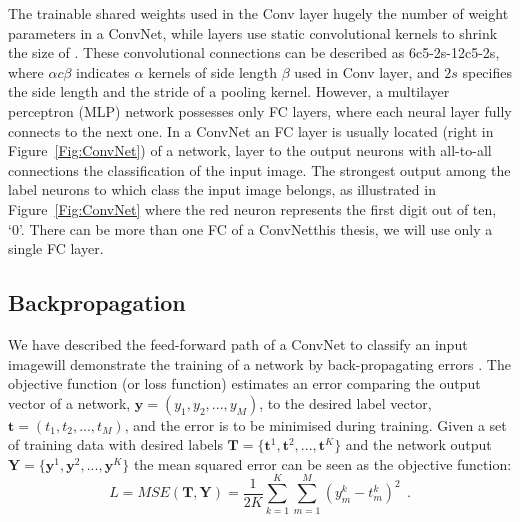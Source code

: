 The trainable shared weights used in the Conv layer hugely \DIFdelbegin {}\DIFdelend \DIFaddbegin {}\DIFaddend the number of weight parameters in a ConvNet, while \DIFdelbegin {}\DIFdelend \DIFaddbegin {}\DIFaddend layers use static convolutional kernels to shrink the size of \DIFdelbegin {}\DIFdelend \DIFaddbegin {}\DIFaddend .
These convolutional connections can be described as 6c5-2s-12c5-2s, where $\alpha c \beta$ indicates $\alpha$ kernels of side length $\beta$ used in \DIFaddbegin {}\DIFaddend Conv layer, and $2s$ specifies the side length and the stride of a pooling kernel.
However, a multilayer perceptron (MLP) network possesses only FC layers, where each neural layer fully connects to the next one.
In a ConvNet an FC layer is usually located \DIFdelbegin {}\DIFdelend \DIFaddbegin {}\DIFaddend (right in Figure~\ref{Fig:ConvNet}) of a network, \DIFdelbegin {}\DIFdelend \DIFaddbegin {}\DIFaddend layer to the output neurons with all-to-all connections \DIFdelbegin {}\DIFdelend \DIFaddbegin {}\DIFaddend the classification of the input image.
The strongest output among the label neurons \DIFdelbegin {}\DIFdelend \DIFaddbegin {}\DIFaddend to which class the input image belongs, as illustrated in Figure~\ref{Fig:ConvNet} where the red neuron represents the first digit out of ten, `0'.
There can be more than one FC \DIFdelbegin {}\DIFdelend \DIFaddbegin {}\DIFaddend of a ConvNet\DIFdelbegin {}\DIFdelend \DIFaddbegin {}\DIFaddend this thesis, we will use only a single FC layer.



\subsection{Backpropagation}
We have described the feed-forward path of a ConvNet to classify an input image\DIFdelbegin {}\DIFdelend \DIFaddbegin {}\DIFaddend will demonstrate the training of a network by back-propagating errors \DIFdelbegin {}\DIFdelend \DIFaddbegin {}\DIFaddend .
The objective function (or loss function) estimates an error \DIFaddbegin {}\DIFaddend comparing the output vector of a network, $\mathbf{y}=(y_1,y_2,...,y_M)$, to the desired label vector, $\mathbf{t}=(t_1,t_2,...,t_M)$, and the error is to be minimised during training.
Given a set of training data with desired labels $\mathbf{T}=\{\mathbf{t}^1, \mathbf{t}^2, ..., \mathbf{t}^K\}$ and the network output $\mathbf{Y}=\{\mathbf{y}^1, \mathbf{y}^2, ..., \mathbf{y}^K\}$ the mean squared error can be seen as the objective function:  
\begin{equation}
L=MSE(\mathbf{T}, \mathbf{Y}) =\frac{1}{2K}\sum_{k=1}^K \sum_{m=1}^M (y^{k}_{m}-t^{k}_{m})^{2}~~.
\label{equ:loss_all}
\end{equation}

